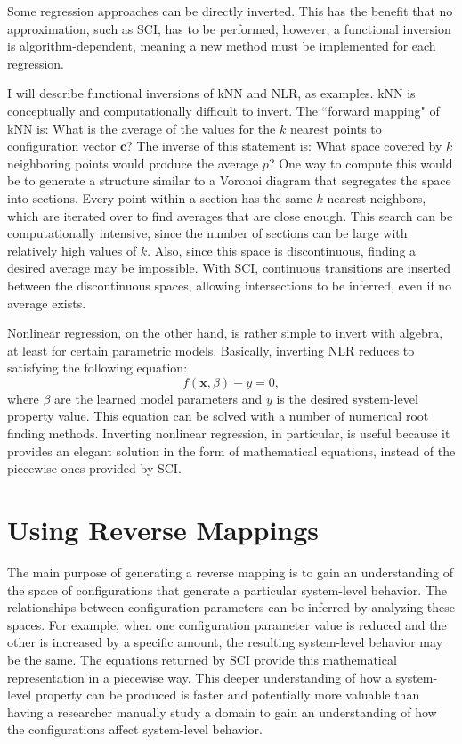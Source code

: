 Some regression approaches can be directly inverted.
This has the benefit that no approximation, such as SCI, has to be performed, however, a functional inversion is algorithm-dependent, meaning a new method must be implemented for each regression.

I will describe functional inversions of kNN and NLR, as examples.
kNN is conceptually and computationally difficult to invert.
The ``forward mapping" of kNN is:
What is the average of the values for the $k$ nearest points to configuration vector $\mathbf c$?
The inverse of this statement is:
What space covered by $k$ neighboring points would produce the average $p$?
One way to compute this would be to generate a structure similar to a Voronoi diagram that segregates the space into sections.
Every point within a section has the same $k$ nearest neighbors, which are iterated over to find averages that are close enough.
This search can be computationally intensive, since the number of sections can be large with relatively high values of $k$.
Also, since this space is discontinuous, finding a desired average may be impossible.
With SCI, continuous transitions are inserted between the discontinuous spaces, allowing intersections to be inferred, even if no average exists.

Nonlinear regression, on the other hand, is rather simple to invert with algebra, at least for certain parametric models.
Basically, inverting NLR reduces to satisfying the following equation:
\[f(\mathbf x, \beta) - y = 0,\]
where $\beta$ are the learned model parameters and $y$ is the desired system-level property value.
This equation can be solved with a number of numerical root finding methods.
Inverting nonlinear regression, in particular, is useful because it provides an elegant solution in the form of mathematical equations, instead of the piecewise ones provided by SCI.


\section{Using Reverse Mappings}
The main purpose of generating a reverse mapping is to gain an understanding of the space of configurations that generate a particular system-level behavior.
The relationships between configuration parameters can be inferred by analyzing these spaces.
For example, when one configuration parameter value is reduced and the other is increased by a specific amount, the resulting system-level behavior may be the same.
The equations returned by SCI provide this mathematical representation in a piecewise way.
This deeper understanding of how a system-level property can be produced is faster and potentially more valuable than having a researcher manually study a domain to gain an understanding of how the configurations affect system-level behavior.


